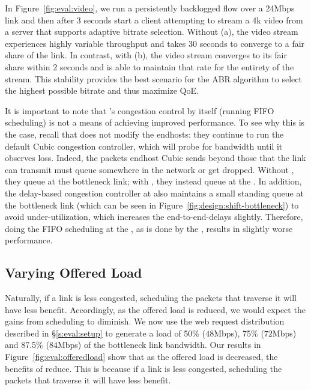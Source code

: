{
\label{s:eval:ratestable}
In Figure~\ref{fig:eval:video}, we run a persistently backlogged flow over a 24Mbps link and then
after 3 seconds start a client attempting to stream a 4k video from a server that supports adaptive
bitrate selection. Without \name (a), the video stream experiences highly variable throughput and 
takes 30 seconds to converge to a fair share of the link. In contrast, with \name (b), the video
stream converges to its fair share within 2 seconds and is able to maintain that rate for the
entirety of the stream. This stability provides the best scenario for the ABR algorithm to select
the highest possible bitrate and thus maximize QoE.
}

 It is important to note that \name's congestion control by itself (\ie running FIFO scheduling) is not a means of achieving improved performance. 
To see why this is the case, recall that \name does not modify the endhosts: they continue to run the default Cubic congestion controller, which will probe for bandwidth until it observes loss.
Indeed, the packets endhost Cubic sends beyond those that the link can transmit must queue somewhere in the network or get dropped. 
Without \name, they queue at the bottleneck link;
with \name, they instead queue at the \inbox. 
In addition, the delay-based congestion controller at \inbox also maintains a small standing queue at the bottleneck link (which can be seen in Figure~\ref{fig:design:shift-bottleneck}) to avoid under-utilization, which increases the end-to-end-delays slightly. 
Therefore, doing the FIFO scheduling at the \name, as is done by the \baseline, results in slightly worse performance.

%




\begin{Appendix}
\section{Varying Offered Load}\label{s:eval:offeredload}
Naturally, if a link is less congested, scheduling the packets that traverse it will have less benefit. Accordingly, as the offered load is reduced, we would expect the gains from scheduling to diminish. 
We now use the web request distribution described in \S\ref{s:eval:setup} to generate a load of 50\% ($48$Mbps), 75\% ($72$Mbps) and 87.5\% ($84$Mbps) of the bottleneck link bandwidth. Our results in Figure~\ref{fig:eval:offeredload} show that as the offered load is decreased, the benefits of \name reduce. This is because if a link is less congested, scheduling the packets that traverse it will have less benefit.
\end{Appendix}


